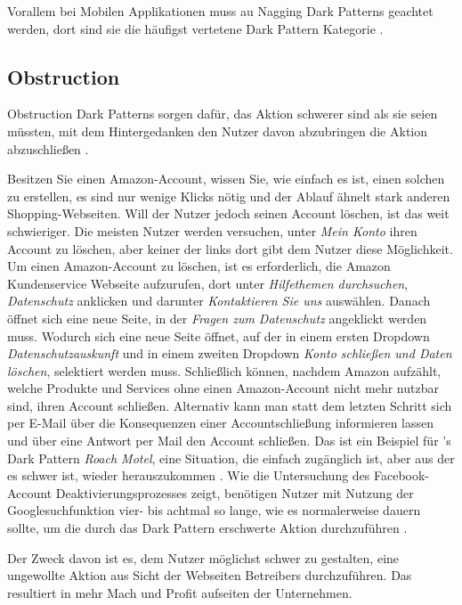 \documentclass[conference,compsoc,final,a4paper]{IEEEtran}
\begin{document}
Vorallem bei Mobilen Applikationen muss au Nagging Dark Patterns geachtet werden, dort sind sie die häufigst vertetene Dark Pattern Kategorie \autocite{DiGeronimo2020}.

\subsection{Obstruction}
\label{chap:Obstruction}
Obstruction Dark Patterns sorgen dafür, das Aktion schwerer sind als sie seien müssten, mit dem Hintergedanken den Nutzer davon abzubringen die Aktion abzuschließen \autocite{Gray_2018}.

Besitzen Sie einen Amazon-Account, wissen Sie, wie einfach es ist, einen solchen zu erstellen, es sind nur wenige Klicks nötig und der Ablauf ähnelt stark anderen Shopping-Webseiten. Will der Nutzer jedoch seinen Account löschen, ist das weit schwieriger. Die meisten Nutzer werden versuchen, unter \textit{Mein Konto} ihren Account zu löschen, aber keiner der links dort gibt dem Nutzer diese Möglichkeit. Um einen Amazon-Account zu löschen, ist es erforderlich, die Amazon Kundenservice Webseite aufzurufen, dort unter \textit{Hilfethemen durchsuchen}, \textit{Datenschutz} anklicken und darunter \textit{Kontaktieren Sie uns} auswählen. Danach öffnet sich eine neue Seite, in der \textit{Fragen zum Datenschutz} angeklickt werden muss. Wodurch sich eine neue Seite öffnet, auf der in einem ersten Dropdown \textit{Datenschutzauskunft} und in einem zweiten Dropdown \textit{Konto schließen und Daten löschen}, selektiert werden muss. Schließlich können, nachdem Amazon aufzählt, welche Produkte und Services ohne einen Amazon-Account nicht mehr nutzbar sind, ihren Account schließen. Alternativ kann man statt dem letzten Schritt sich per E-Mail über die Konsequenzen einer Accountschließung informieren lassen und über eine Antwort per Mail den Account schließen. Das ist ein Beispiel für \citeauthor{Brignull}'s Dark Pattern \textit{Roach Motel}, eine Situation, die einfach zugänglich ist, aber aus der es schwer ist, wieder herauszukommen \autocite{Brignull}. Wie die Untersuchung des Facebook-Account Deaktivierungsprozesses zeigt, benötigen Nutzer mit Nutzung der Googlesuchfunktion vier- bis achtmal so lange, wie es normalerweise dauern sollte, um die durch das Dark Pattern erschwerte Aktion durchzuführen \autocite{M.Bhoot2020}.

Der Zweck davon ist es, dem Nutzer möglichst schwer zu gestalten, eine ungewollte Aktion aus Sicht der Webseiten Betreibers durchzuführen. Das resultiert in mehr Mach und Profit aufseiten der Unternehmen.
\end{document}
